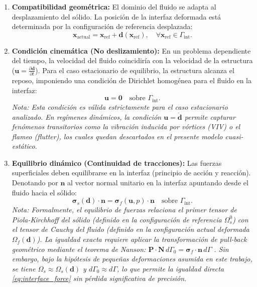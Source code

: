 \documentclass[12pt, letterpaper]{report}
\theoremstyle{definition}
\begin{document}
\begin{enumerate}
    \item \textbf{Compatibilidad geométrica:} El dominio del fluido se adapta al desplazamiento del sólido. La posición de la interfaz deformada está determinada por la configuración de referencia desplazada:
    \[
    \mathbf{x}_{\text{actual}} = \mathbf{x}_{\text{ref}} + \mathbf{d}(\mathbf{x}_{\text{ref}}), \quad \forall \mathbf{x}_{\text{ref}} \in \Gamma_{\text{int}}.
    \]
    
    \item \textbf{Condición cinemática (No deslizamiento):} En un problema dependiente del tiempo, la velocidad del fluido coincidiría con la velocidad de la estructura \\ ($\mathbf{u} = \frac{\partial \mathbf{d}}{\partial t}$). Para el caso estacionario de equilibrio, la estructura alcanza el reposo, imponiendo una condición de Dirichlet homogénea para el fluido en la interfaz:
    \begin{equation}
        \mathbf{u} = \mathbf{0} \quad \text{sobre } \Gamma_{\text{int}}.
    \end{equation}
    \emph{Nota: Esta condición es válida estrictamente para el caso estacionario analizado. En regímenes dinámicos, la condición $\mathbf{u} = \dot{\mathbf{d}}$ permite capturar fenómenos transitorios como la vibración inducida por vórtices (VIV) o el flameo (\textit{flutter}), los cuales quedan descartados en el presente modelo cuasi-estático.}
    
    \item \textbf{Equilibrio dinámico (Continuidad de tracciones):} Las fuerzas superficiales deben equilibrarse en la interfaz (principio de acción y reacción). Denotando por $\mathbf{n}$ al vector normal unitario en la interfaz apuntando desde el fluido hacia el sólido:
    \begin{equation} \label{eq:interface_force}
        \boldsymbol{\sigma}_s(\mathbf{d}) \cdot \mathbf{n} = \boldsymbol{\sigma}_f(\mathbf{u}, p) \cdot \mathbf{n} \quad \text{sobre } \Gamma_{\text{int}}.
    \end{equation}
    \emph{Nota: Formalmente, el equilibrio de fuerzas relaciona el primer tensor de Piola-Kirchhoff del sólido (definido en la configuración de referencia $\Omega_s^0$) con el tensor de Cauchy del fluido (definido en la configuración actual deformada $\Omega_f(\mathbf{d})$). La igualdad exacta requiere aplicar la transformación de \textit{pull-back} geométrico mediante el teorema de Nanson: $\mathbf{P} \cdot \mathbf{N} \, d\Gamma_0 = \boldsymbol{\sigma}_f \cdot \mathbf{n} \, d\Gamma$ \cite{donea2004arbitrary}. Sin embargo, bajo la hipótesis de pequeñas deformaciones asumida en este trabajo, se tiene $\Omega_s \approx \Omega_s(\mathbf{d})$ y $d\Gamma_0 \approx d\Gamma$, lo que permite la igualdad directa \eqref{eq:interface_force} sin pérdida significativa de precisión.}
\end{enumerate}
\end{document}
